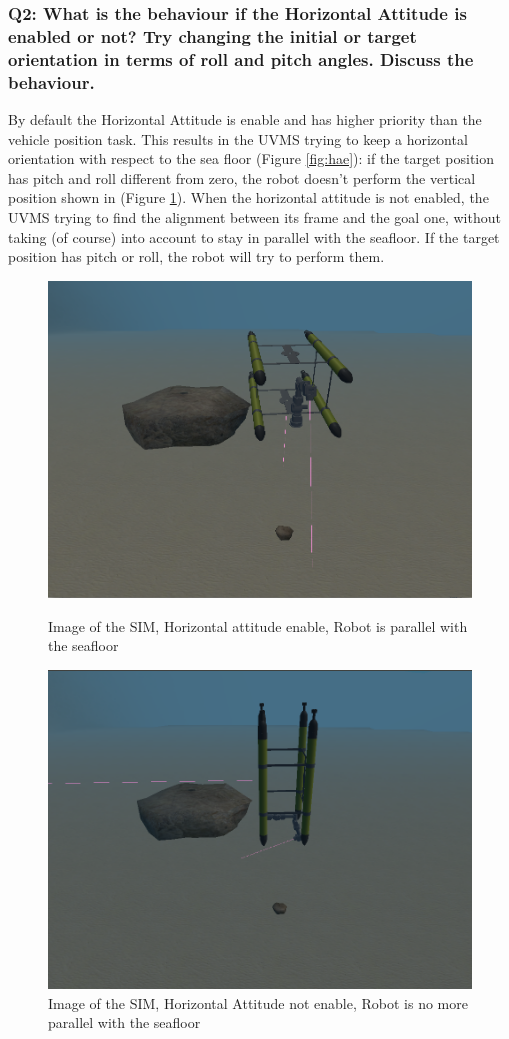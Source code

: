\documentclass{article}
\begin{document}
\subsubsection{Q2: What is the behaviour if the Horizontal Attitude is enabled or not? Try changing the initial or target orientation in terms of roll and pitch angles. Discuss the behaviour.} 
By default the Horizontal Attitude is enable and has higher priority than the vehicle position task. This results in the UVMS trying to keep a horizontal orientation with respect to the sea floor (Figure  \ref{fig:hae}): if the target position has pitch and roll different from zero, the robot doesn’t perform the vertical position shown in (Figure  \ref{fig:hane}).
When the horizontal attitude is not enabled, the UVMS trying to find the alignment between its frame and the goal one, without taking (of course) into account to stay in parallel with the seafloor. If the target position has pitch or roll, the robot will try to perform them.

\begin{figure}[htp]
\centering
\includegraphics[width=.6\textwidth]{112_HAenabled.png}\caption{Image of the SIM, Horizontal attitude enable, Robot is parallel with the seafloor}
\label{fig:hae}
\centering
\includegraphics[width=.6\textwidth]{112_HANotenabled.png}\caption{Image of the SIM, Horizontal Attitude not enable, Robot is no more parallel with the seafloor}
\label{fig:hane}
\end{figure}
\end{document}
